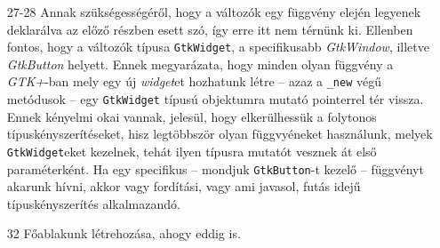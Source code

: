 \documentclass[a4paper,10pt]{article}
\begin{document}
\begin{enumerate}
 \item[27-28] Annak szükségességéről, hogy a változók egy függvény elején legyenek deklarálva az előző részben esett szó, így erre itt nem térnünk ki. Ellenben fontos, hogy a változók típusa \texttt{GtkWidget}, a specifikusabb \textit{GtkWindow}, illetve \textit{GtkButton} helyett. Ennek megyarázata, hogy minden olyan függvény a \textit{GTK+}-ban mely egy új \textit{widget}et hozhatunk létre -- azaz a \texttt{\_new} végű metódusok -- egy \texttt{GtkWidget} típusú objektumra mutató pointerrel tér vissza. Ennek kényelmi okai vannak, jelesül, hogy elkerülhessük a folytonos típuskényszerítéseket, hisz legtöbbször olyan függvyéneket használunk, melyek \texttt{GtkWidget}eket kezelnek, tehát ilyen típusra mutatót vesznek át első paraméterként. Ha egy specifikus -- mondjuk \texttt{GtkButton}-t kezelő -- függvényt akarunk hívni, akkor vagy fordítási, vagy ami javasol, futás idejű típuskényszerítés alkalmazandó.

 \item[32] Főablakunk létrehozása, ahogy eddig is.


\end{enumerate}
\end{document}
